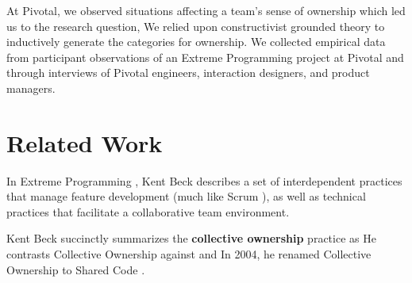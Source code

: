 At Pivotal, we observed situations affecting a team's sense of ownership which led us to the research question,  We relied upon constructivist grounded theory to inductively generate the categories for ownership. We collected empirical data from participant observations of an Extreme Programming project at Pivotal and through interviews of Pivotal engineers, interaction designers, and product managers.  %

\section{Related Work}
\label{RelatedWork}
In Extreme Programming \cite{ExtremeProgramming2004}, Kent Beck describes a set of interdependent practices that manage feature development (much like Scrum \cite{Scrum}), as well as technical practices that facilitate a collaborative team environment. 


Kent Beck succinctly summarizes the \textbf{collective ownership} practice as  \cite{ExtremeProgramming2000} He contrasts Collective Ownership against  and  In 2004, he renamed Collective Ownership to Shared Code \cite{ExtremeProgramming2004}.

